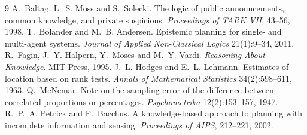\documentclass[11pt,a4paper]{article}
\theoremstyle{definition}
\begin{document}
\begin{thebibliography}{9}
 A.~Baltag, L.~S. Moss and S.~Solecki.
The logic of public announcements, common knowledge, and private suspicions.
\emph{Proceedings of TARK VII}, 43--56, 1998.
 T.~Bolander and M.~B. Andersen.
Epistemic planning for single- and multi-agent systems.
\emph{Journal of Applied Non-Classical Logics} 21(1):9--34, 2011.
 R.~Fagin, J.~Y. Halpern, Y.~Moses and M.~Y. Vardi.
\emph{Reasoning About Knowledge}. MIT Press, 1995.
 J.~L. Hodges and E.~L. Lehmann.
Estimates of location based on rank tests.
\emph{Annals of Mathematical Statistics} 34(2):598--611, 1963.
 Q.~McNemar.
Note on the sampling error of the difference between correlated proportions or percentages.
\emph{Psychometrika} 12(2):153--157, 1947.
 R.~P.~A. Petrick and F.~Bacchus.
A knowledge-based approach to planning with incomplete information and sensing.
\emph{Proceedings of AIPS}, 212--221, 2002.
\end{thebibliography}
\end{document}

